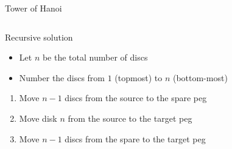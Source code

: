 \documentclass{beamer}
\begin{document}
\begin{frame}[fragile]{Tower of Hanoi}
  \begin{columns}
    \begin{column}{.6\textwidth}
      \begin{block}{Recursive solution}
        \begin{itemize}
        \item Let $n$ be the total number of discs
        \item Number the discs from $1$ (topmost) to $n$ (bottom-most)
        \end{itemize}

        \begin{enumerate}
        \item Move $n-1$ discs from the source to the spare peg
        \item Move disk $n$ from the source to the target peg
        \item Move $n-1$ discs from the spare to the target peg
        \end{enumerate}
      \end{block}
    \end{column}


\end{columns}
\end{frame}
\end{document}
